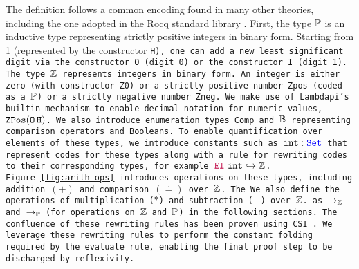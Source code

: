 The definition  follows a common encoding found in many other theories, including the one adopted in the Rocq standard library \cite{Rocq-refman}.
First, the type $\mathbb{P}$  is an inductive type representing strictly positive integers in binary form.
Starting from 1 (represented by the constructor \tt{H}), one can add a new least significant digit via the constructor \tt{O} (digit 0) or the constructor \tt{I} (digit 1). 
The type $\mathbb{Z}$ represents integers in binary form.
An integer is either zero (with constructor \tt{Z0}) or a strictly positive number \tt{Zpos} (coded as a $\mathbb{P}$) or a strictly negative number \tt{Zneg}.
We make use of Lambdapi's \lstinline[language=Lambdapi,basicstyle=\ttfamily\footnotesize]|builtin| mechanism to enable decimal notation for numeric values,  $\mathop{\texttt{ZPos}} (\mathop{\texttt{O}} \texttt{H})$.
%
We also introduce enumeration types \tt{Comp} and $\mathbb{B}$ representing comparison operators and Booleans. 
%
To enable quantification over elements of these types, we introduce constants such as $\texttt{int}: \textcolor{blue}{\texttt{\upshape{Set}}}$ that represent codes for these types along with a rule for rewriting codes to their corresponding types, for example $\textcolor{purple}{\mathop{\texttt{\upshape{El}}}}~\texttt{int} \hookrightarrow \mathbb{Z}$.
Figure~\ref{fig:arith-ops} introduces operations on these types, including addition $(+)$ and comparison $(\doteq)$ over $\mathbb{Z}$. The 
We also define the operations of multiplication ($\mathbin{*}$) and subtraction ($\mathbin{-}$) over $\mathbb{Z}$. 
 as $\rightarrow_\mathbb{Z}$ and $\rightarrow_\mathbb{P}$ (for operations on $\mathbb{Z}$ and $\mathbb{P}$) in the following sections.
The confluence of these rewriting rules has been proven using CSI \cite{CSI}. %
We leverage these rewriting rules to perform the constant folding required by the \texttt{evaluate} rule, enabling the final proof step to be discharged by reflexivity.

